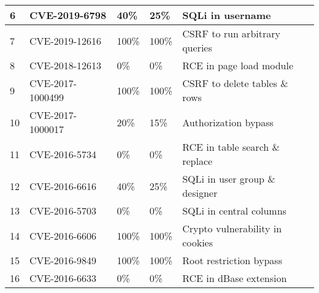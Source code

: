 \begin{table}[]
\begin{adjustbox}{max width=0.65\textwidth}
\begin{tabular}{|lllll|}
    \multicolumn{1}{|l|}{6}           & \multicolumn{1}{l|}{CVE-2019-6798}    & \multicolumn{1}{l|}{40\%}                 & \multicolumn{1}{l|}{25\%}              & SQLi in username                \\ \hline
    \multicolumn{1}{|l|}{7}           & \multicolumn{1}{l|}{CVE-2019-12616}   & \multicolumn{1}{l|}{100\%}                & \multicolumn{1}{l|}{100\%}             & CSRF to run arbitrary queries   \\ \hline
    \multicolumn{1}{|l|}{8}           & \multicolumn{1}{l|}{CVE-2018-12613}   & \multicolumn{1}{l|}{0\%}                  & \multicolumn{1}{l|}{0\%}               & RCE in page load module         \\ \hline
    \multicolumn{1}{|l|}{9}           & \multicolumn{1}{l|}{CVE-2017-1000499} & \multicolumn{1}{l|}{100\%}                & \multicolumn{1}{l|}{100\%}             & CSRF to delete tables \& rows   \\ \hline
    \multicolumn{1}{|l|}{10}          & \multicolumn{1}{l|}{CVE-2017-1000017} & \multicolumn{1}{l|}{20\%}                 & \multicolumn{1}{l|}{15\%}              & Authorization bypass            \\ \hline
    \multicolumn{1}{|l|}{11}          & \multicolumn{1}{l|}{CVE-2016-5734}    & \multicolumn{1}{l|}{0\%}                  & \multicolumn{1}{l|}{0\%}               & RCE in table search \& replace  \\ \hline
    \multicolumn{1}{|l|}{12}          & \multicolumn{1}{l|}{CVE-2016-6616}    & \multicolumn{1}{l|}{40\%}                 & \multicolumn{1}{l|}{25\%}              & SQLi in user group \& designer  \\ \hline
    \multicolumn{1}{|l|}{13}          & \multicolumn{1}{l|}{CVE-2016-5703}    & \multicolumn{1}{l|}{0\%}                  & \multicolumn{1}{l|}{0\%}               & SQLi in central columns         \\ \hline
    \multicolumn{1}{|l|}{14}          & \multicolumn{1}{l|}{CVE-2016-6606}    & \multicolumn{1}{l|}{100\%}                & \multicolumn{1}{l|}{100\%}             & Crypto vulnerability in cookies \\ \hline
    \multicolumn{1}{|l|}{15}          & \multicolumn{1}{l|}{CVE-2016-9849}    & \multicolumn{1}{l|}{100\%}                & \multicolumn{1}{l|}{100\%}             & Root restriction bypass         \\ \hline
    \multicolumn{1}{|l|}{16}          & \multicolumn{1}{l|}{CVE-2016-6633}    & \multicolumn{1}{l|}{0\%}                  & \multicolumn{1}{l|}{0\%}               & RCE in dBase extension          \\ \hline

\end{tabular}
\end{adjustbox}
\end{table}
